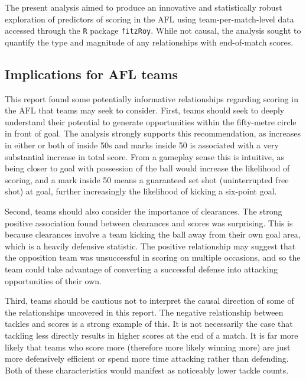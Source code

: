 \documentclass{article}
\begin{document}
The present analysis aimed to produce an innovative and statistically
robust exploration of predictors of scoring in the AFL using
team-per-match-level data accessed through the \texttt{R} package
\texttt{fitzRoy}. While not causal, the analysis sought to quantify the
type and magnitude of any relationships with end-of-match scores.

\hypertarget{implications-for-afl-teams}{%
\subsection{Implications for AFL
teams}\label{implications-for-afl-teams}}

This report found some potentially informative relationships regarding
scoring in the AFL that teams may seek to consider. First, teams should
seek to deeply understand their potential to generate opportunities
within the fifty-metre circle in front of goal. The analysis strongly
supports this recommendation, as increases in either or both of inside
50s and marks inside 50 is associated with a very substantial increase
in total score. From a gameplay sense this is intuitive, as being closer
to goal with possession of the ball would increase the likelihood of
scoring, and a mark inside 50 means a guaranteed set shot (uninterrupted
free shot) at goal, further increasingly the likelihood of kicking a
six-point goal.

Second, teams should also consider the importance of clearances. The
strong positive association found between clearances and scores was
surprising. This is because clearances involve a team kicking the ball
away from their own goal area, which is a heavily defensive statistic.
The positive relationship may suggest that the opposition team was
unsuccessful in scoring on multiple occasions, and so the team could
take advantage of converting a successful defense into attacking
opportunities of their own.

Third, teams should be cautious not to interpret the causal direction of
some of the relationships uncovered in this report. The negative
relationship between tackles and scores is a strong example of this. It
is not necessarily the case that tackling less directly results in
higher scores at the end of a match. It is far more likely that teams
who score more (therefore more likely winning more) are just more
defensively efficient or spend more time attacking rather than
defending. Both of these characteristics would manifest as noticeably
lower tackle counts.
\end{document}
